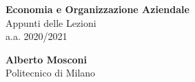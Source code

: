 \documentclass[12pt, letterpaper]{article}
\begin{document}
\begin{titlepage}
    \vspace*{2cm}
    \begin{center}
        \huge{\bfseries Economia e Organizzazione Aziendale} \\[10pt]
        \Large{Appunti delle Lezioni} \\[10pt]
        \large{a.a. 2020/2021} \\
    \end{center}
    \vfill
    \begin{flushleft}        
        \large
        \textbf{Alberto Mosconi} \\
        \normalsize
        Politecnico di Milano
    \end{flushleft}
\end{titlepage}

\thispagestyle{empty}
\tableofcontents

\setcounter{page}{1}





\end{document}
